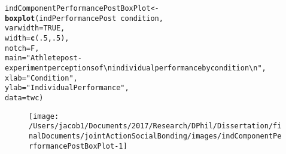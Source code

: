 \documentclass[english]{article}\usepackage[]{graphicx}\usepackage[]{color}
\makeatletter
\def\maxwidth{ %
  \ifdim\Gin@nat@width>\linewidth
    \linewidth
  \else
    \Gin@nat@width
  \fi
}
\newcommand{\hlnum}[1]{\textcolor[rgb]{0.686,0.059,0.569}{#1}}%
\newcommand{\hlstr}[1]{\textcolor[rgb]{0.192,0.494,0.8}{#1}}%
\newcommand{\hlopt}[1]{\textcolor[rgb]{0,0,0}{#1}}%
\newcommand{\hlstd}[1]{\textcolor[rgb]{0.345,0.345,0.345}{#1}}%
\newcommand{\hlkwb}[1]{\textcolor[rgb]{0.69,0.353,0.396}{#1}}%
\newcommand{\hlkwc}[1]{\textcolor[rgb]{0.333,0.667,0.333}{#1}}%
\newcommand{\hlkwd}[1]{\textcolor[rgb]{0.737,0.353,0.396}{\textbf{#1}}}%
\newenvironment{kframe}{%
 \def\at@end@of@kframe{}%
 \ifinner\ifhmode%
  \def\at@end@of@kframe{\end{minipage}}%
  \begin{minipage}{\columnwidth}%
 \fi\fi%
 \def\FrameCommand##1{\hskip\@totalleftmargin \hskip-\fboxsep
 \colorbox{shadecolor}{##1}\hskip-\fboxsep
     \hskip-\linewidth \hskip-\@totalleftmargin \hskip\columnwidth}%
 \MakeFramed {\advance\hsize-\width
   \@totalleftmargin\z@ \linewidth\hsize
   \@setminipage}}%
 {\par\unskip\endMakeFramed%
 \at@end@of@kframe}
\newenvironment{knitrout}{}{} %
\makeatother
\begin{document}
\begin{knitrout}
\color{fgcolor}\begin{kframe}
\begin{alltt}
  \hlstd{indComponentPerformancePostBoxPlot} \hlkwb{<-} \hlkwd{boxplot}\hlstd{(indPerformancePost} \hlopt{~} \hlstd{condition,}
                                          \hlkwc{varwidth} \hlstd{=} \hlnum{TRUE}\hlstd{,}
                                          \hlkwc{width} \hlstd{=} \hlkwd{c}\hlstd{(}\hlnum{.5}\hlstd{,}\hlnum{.5}\hlstd{),}
                                          \hlkwc{notch} \hlstd{= F,}
                                          \hlkwc{main} \hlstd{=} \hlstr{"Athlete post-experiment perceptions of \textbackslash{}n individual performance by condition \textbackslash{}n"}\hlstd{,}
                                          \hlkwc{xlab} \hlstd{=} \hlstr{"Condition"}\hlstd{,}
                                          \hlkwc{ylab} \hlstd{=} \hlstr{"Individual Performance"}\hlstd{,}
                                          \hlkwc{data} \hlstd{= twc)}
\end{alltt}
\end{kframe}\begin{figure}

{\centering \texttt{[image: /Users/jacob1/Documents/2017/Research/DPhil/Dissertation/finalDocuments/jointActionSocialBonding/images/indComponentPerformancePostBoxPlot-1]} 

}

\end{figure}


\end{knitrout}
\end{document}
